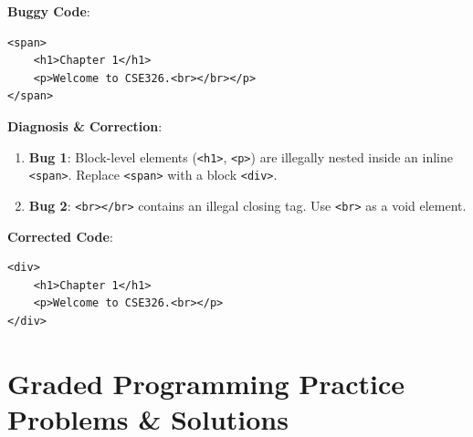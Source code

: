 \begin{debuggingbox}
\textbf{Buggy Code}:
\begin{lstlisting}[language=HTML5]
<span>
    <h1>Chapter 1</h1>
    <p>Welcome to CSE326.<br></br></p>
</span>
\end{lstlisting}
\textbf{Diagnosis \& Correction}:
\begin{enumerate}
    \item \textbf{Bug 1}: Block-level elements (\texttt{<h1>}, \texttt{<p>}) are illegally nested inside an inline \texttt{<span>}. Replace \texttt{<span>} with a block \texttt{<div>}.
    \item \textbf{Bug 2}: \texttt{<br></br>} contains an illegal closing tag. Use \texttt{<br>} as a void element.
\end{enumerate}
\textbf{Corrected Code}:
\begin{lstlisting}[language=HTML5]
<div>
    <h1>Chapter 1</h1>
    <p>Welcome to CSE326.<br></p>
</div>
\end{lstlisting}
\end{debuggingbox}

\section{Graded Programming Practice Problems \& Solutions}

